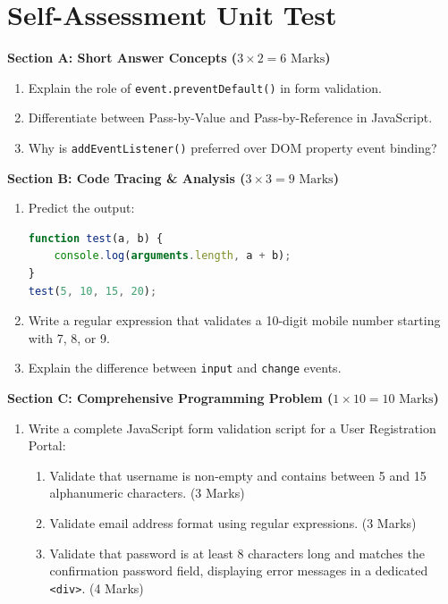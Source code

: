 \section{Self-Assessment Unit Test}

\begin{chaptertest}
\noindent\textbf{Section A: Short Answer Concepts ($3 \times 2 = 6\text{ Marks}$)}
\begin{enumerate}
    \item Explain the role of \texttt{event.preventDefault()} in form validation.
    \item Differentiate between Pass-by-Value and Pass-by-Reference in JavaScript.
    \item Why is \texttt{addEventListener()} preferred over DOM property event binding?
\end{enumerate}

\medskip
\noindent\textbf{Section B: Code Tracing \& Analysis ($3 \times 3 = 9\text{ Marks}$)}
\begin{enumerate}[start=4]
    \item Predict the output:
    \begin{lstlisting}[language=JavaScript]
function test(a, b) {
    console.log(arguments.length, a + b);
}
test(5, 10, 15, 20);
    \end{lstlisting}
    \item Write a regular expression that validates a 10-digit mobile number starting with 7, 8, or 9.
    \item Explain the difference between \texttt{input} and \texttt{change} events.
\end{enumerate}

\medskip
\noindent\textbf{Section C: Comprehensive Programming Problem ($1 \times 10 = 10\text{ Marks}$)}
\begin{enumerate}[start=7]
    \item Write a complete JavaScript form validation script for a User Registration Portal:
    \begin{enumerate}[label=(\alph*)]
        \item Validate that username is non-empty and contains between 5 and 15 alphanumeric characters. (3 Marks)
        \item Validate email address format using regular expressions. (3 Marks)
        \item Validate that password is at least 8 characters long and matches the confirmation password field, displaying error messages in a dedicated \texttt{<div>}. (4 Marks)
    \end{enumerate}
\end{enumerate}
\end{chaptertest}

